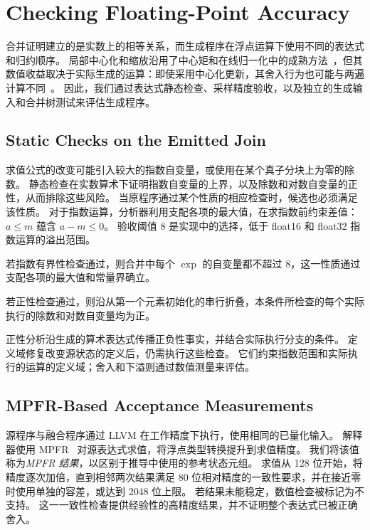 \section{Checking Floating-Point Accuracy}
\label{sec:accuracy}

合并证明建立的是实数上的相等关系，而生成程序在浮点运算下使用不同的表达式和归约顺序。
局部中心化和缩放沿用了中心矩和在线归一化中的成熟方法~\citep{chan,pebay,milakov,blanchard}，但其数值收益取决于实际生成的运算：即使采用中心化更新，其舍入行为也可能与两遍计算不同~\citep{chan}。
因此，我们通过表达式静态检查、采样精度验收，以及独立的生成输入和合并树测试来评估生成程序。

\subsection{Static Checks on the Emitted Join}
\label{sec:hazards}
\label{sec:static}

求值公式的改变可能引入较大的指数自变量，或使用在某个真子分块上为零的除数。
静态检查在实数算术下证明指数自变量的上界，以及除数和对数自变量的正性，从而排除这些风险。
当原程序通过某个性质的相应检查时，候选也必须满足该性质。
对于指数运算，分析器利用支配各项的最大值，在求指数前约束差值：$a\le m$ 蕴含 $a-m\le0$。
验收阈值 8 是实现中的选择，低于 float16 和 float32 指数运算的溢出范围。

\begin{proposition}
\label{prop:exp}
若指数有界性检查通过，则合并中每个 $\exp$ 的自变量都不超过 8，这一性质通过支配各项的最大值和常量界确立。
\end{proposition}

\begin{proposition}
\label{prop:div}
若正性检查通过，则沿从第一个元素初始化的串行折叠，本条件所检查的每个实际执行的除数和对数自变量均为正。
\end{proposition}

正性分析沿生成的算术表达式传播正负性事实，并结合实际执行分支的条件。
定义域修复改变源状态的定义后，仍需执行这些检查。
它们约束指数范围和实际执行的运算的定义域；舍入和下溢则通过数值测量来评估。

\subsection{MPFR-Based Acceptance Measurements}

源程序与融合程序通过 LLVM 在工作精度下执行，使用相同的已量化输入。
解释器使用 MPFR~\citep{mpfr} 对源表达式求值，将浮点类型转换提升到求值精度。
我们将该值称为\emph{MPFR 结果}，以区别于推导中使用的参考状态元组。
求值从 128 位开始，将精度逐次加倍，直到相邻两次结果满足 80 位相对精度的一致性要求，并在接近零时使用单独的容差，或达到 2048 位上限。
若结果未能稳定，数值检查被标记为不支持。
这一一致性检查提供经验性的高精度结果，并不证明整个表达式已被正确舍入。

